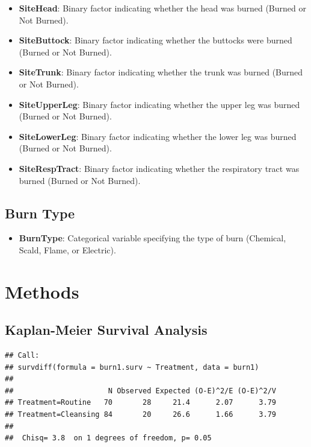 \documentclass[12pt]{article}
\providecommand{\tightlist}{%
  \setlength{\itemsep}{0pt}\setlength{\parskip}{0pt}}
\begin{document}
\begin{itemize}
\tightlist
\item
  \textbf{SiteHead}: Binary factor indicating whether the head was
  burned (Burned or Not Burned).
\item
  \textbf{SiteButtock}: Binary factor indicating whether the buttocks
  were burned (Burned or Not Burned).
\item
  \textbf{SiteTrunk}: Binary factor indicating whether the trunk was
  burned (Burned or Not Burned).
\item
  \textbf{SiteUpperLeg}: Binary factor indicating whether the upper leg
  was burned (Burned or Not Burned).
\item
  \textbf{SiteLowerLeg}: Binary factor indicating whether the lower leg
  was burned (Burned or Not Burned).
\item
  \textbf{SiteRespTract}: Binary factor indicating whether the
  respiratory tract was burned (Burned or Not Burned).
\end{itemize}

\subsection{\texorpdfstring{\textbf{Burn
Type}}{Burn Type}}\label{burn-type}

\begin{itemize}
\tightlist
\item
  \textbf{BurnType}: Categorical variable specifying the type of burn
  (Chemical, Scald, Flame, or Electric).
\end{itemize}

\section{Methods}\label{methods}

\subsection{\texorpdfstring{\textbf{Kaplan-Meier Survival
Analysis}}{Kaplan-Meier Survival Analysis}}\label{kaplan-meier-survival-analysis}

\begin{verbatim}
## Call:
## survdiff(formula = burn1.surv ~ Treatment, data = burn1)
## 
##                      N Observed Expected (O-E)^2/E (O-E)^2/V
## Treatment=Routine   70       28     21.4      2.07      3.79
## Treatment=Cleansing 84       20     26.6      1.66      3.79
## 
##  Chisq= 3.8  on 1 degrees of freedom, p= 0.05
\end{verbatim}
\end{document}

